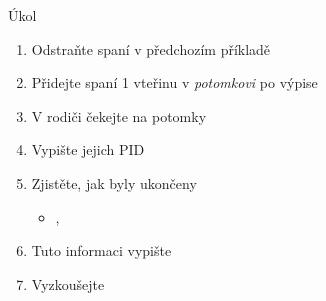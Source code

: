 \begin{frame}{Úkol}

  \begin{enumerate}
    \item Odstraňte spaní v předchozím příkladě
    \item Přidejte spaní 1 vteřinu v \emph{potomkovi} po výpise
    \item V rodiči čekejte na potomky
    \item Vypište jejich PID

    \item Zjistěte, jak byly ukončeny
    \begin{itemize}
      \item {}, 
    \end{itemize}

    \item Tuto informaci vypište
    \item Vyzkoušejte
  \end{enumerate}

\end{frame}

